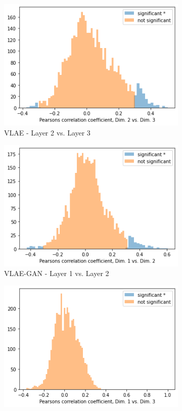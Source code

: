 \begin{figure}
\begin{subfigure}{.3\textwidth}
        \includegraphics[width=\textwidth]{images/notprop/dsprites/vlae/dim_2_3.png}
        \caption{\ac{VLAE} - Layer 2 vs. Layer 3}
    \end{subfigure}
    \begin{subfigure}{.3\textwidth}
        \includegraphics[width=\textwidth]{images/notprop/dsprites/vlae_gan/dim_1_2.png}
        \caption{\ac{VLAE}-\ac{GAN} - Layer 1 vs. Layer 2}
    \end{subfigure}
    \hfill
    \begin{subfigure}{.3\textwidth}
        \includegraphics[width=\textwidth]{images/notprop/dsprites/vlae_gan/dim_1_3.png}

\end{subfigure}
\end{figure}
